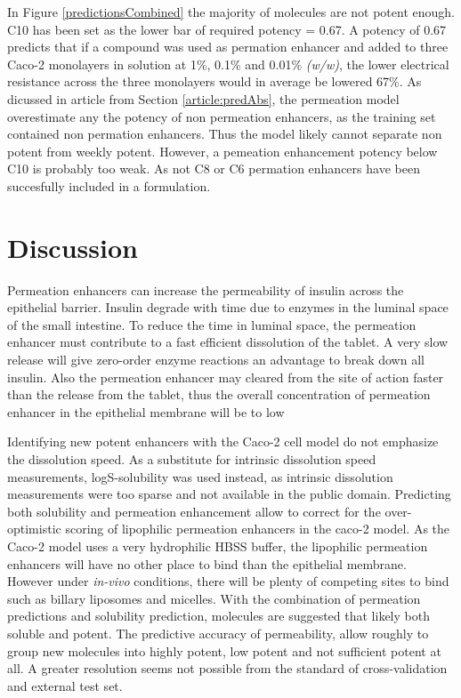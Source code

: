 In Figure \ref{predictionsCombined} the majority of molecules are not potent enough. C10 has been set as the lower bar of required potency = 0.67. A potency of 0.67 predicts that if a compound was used as permation enhancer and added to three Caco-2 monolayers in solution at 1\%, 0.1\% and 0.01\% \textit{(w/w)}, the lower electrical resistance across the three monolayers would in average be lowered 67\%. As dicussed in article from Section \ref{article:predAbs}, the permeation model overestimate any the potency of non permeation enhancers, as the training set contained non permation enhancers. Thus the model likely cannot separate non potent from weekly potent. However, a pemeation enhancement potency below C10 is probably too weak. As not C8 or C6 permation enhancers have been succesfully included in a formulation.

\section{Discussion}

Permeation enhancers can increase the permeability of insulin across the epithelial barrier. Insulin degrade with time due to enzymes in the luminal space of the small intestine. To reduce the time in luminal space, the permeation enhancer must contribute to a fast efficient dissolution of the tablet. A very slow release will give zero-order enzyme reactions an advantage to break down all insulin. Also the permeation enhancer may cleared from the site of action faster than the release from the tablet, thus the overall concentration of permeation enhancer in the epithelial membrane will be to low

Identifying new potent enhancers with the Caco-2 cell model do not emphasize the dissolution speed. As a substitute for intrinsic dissolution speed measurements, logS-solubility was used instead, as intrinsic dissolution measurements were too sparse and not available in the public domain. Predicting both solubility and permeation enhancement allow to correct for the over-optimistic scoring of lipophilic permeation enhancers in the caco-2 model. As the Caco-2 model uses a very hydrophilic HBSS buffer, the lipophilic permeation enhancers will have no other place to bind than the epithelial membrane. However under \textit{in-vivo} conditions, there will be plenty of competing sites to bind such as billary liposomes and micelles. With the combination of permeation predictions and solubility prediction, molecules are suggested that likely both soluble and potent. The predictive accuracy of permeability, allow roughly to group new molecules into highly potent, low potent and not sufficient potent at all. A greater resolution seems not possible from the standard of cross-validation and external test set.

